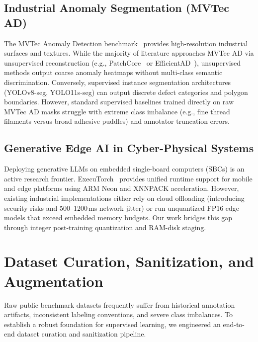 \documentclass[conference]{IEEEtran}
\begin{document}
\subsection{Industrial Anomaly Segmentation (MVTec AD)}
The MVTec Anomaly Detection benchmark~\cite{bergmann2019mvtec} provides high-resolution industrial surfaces and textures. While the majority of literature approaches MVTec AD via unsupervised reconstruction (e.g., PatchCore~\cite{roth2022patchcore} or EfficientAD~\cite{batzner2024efficientad}), unsupervised methods output coarse anomaly heatmaps without multi-class semantic discrimination. Conversely, supervised instance segmentation architectures (YOLOv8-seg, YOLO11s-seg) can output discrete defect categories and polygon boundaries. However, standard supervised baselines trained directly on raw MVTec AD masks struggle with extreme class imbalance (e.g., fine thread filaments versus broad adhesive puddles) and annotator truncation errors.

\subsection{Generative Edge AI in Cyber-Physical Systems}
Deploying generative LLMs on embedded single-board computers (SBCs) is an active research frontier. ExecuTorch~\cite{executorch2024meta} provides unified runtime support for mobile and edge platforms using ARM Neon and XNNPACK acceleration. However, existing industrial implementations either rely on cloud offloading (introducing security risks and 500--1200\,ms network jitter) or run unquantized FP16 edge models that exceed embedded memory budgets. Our work bridges this gap through integer post-training quantization and RAM-disk staging.

\section{Dataset Curation, Sanitization, and Augmentation}

Raw public benchmark datasets frequently suffer from historical annotation artifacts, inconsistent labeling conventions, and severe class imbalances. To establish a robust foundation for supervised learning, we engineered an end-to-end dataset curation and sanitization pipeline.
\end{document}

